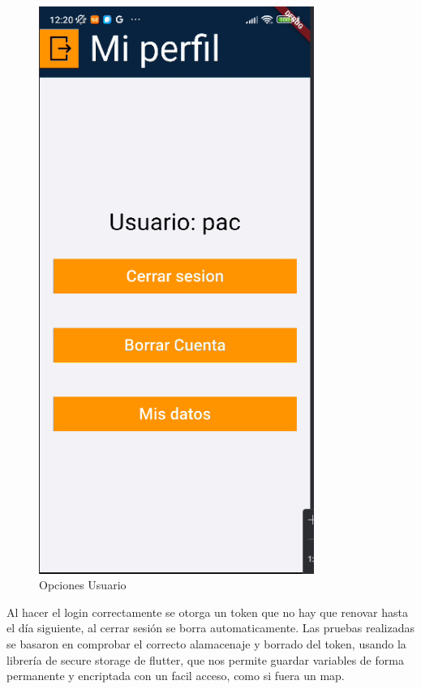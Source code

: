 \begin{figure}[H]
   \centering
    \includegraphics[width=0.8\textwidth]{pantallas/OpcUser.png}
    \caption{Opciones Usuario}
    \label{fig:Opciones Usuario}
\end{figure}

Al hacer el login correctamente se otorga un token que no hay que renovar hasta el día siguiente, al cerrar sesión se borra automaticamente. Las pruebas realizadas se basaron en comprobar el correcto alamacenaje y borrado del token, usando la librería de secure storage de flutter, que nos permite guardar variables de forma permanente y encriptada con un facil acceso, como si fuera un map.

